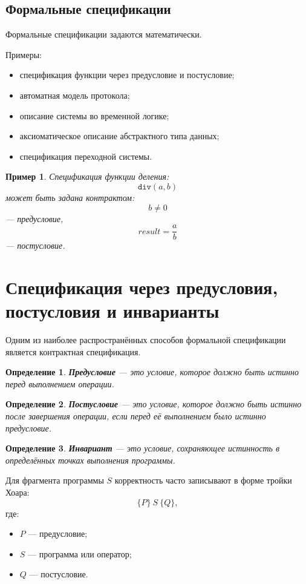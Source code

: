 \documentclass[12pt,a4paper]{article}
\newtheorem{definition}{Определение}
\newtheorem{example}{Пример}
\begin{document}
\subsection{Формальные спецификации}

Формальные спецификации задаются математически.

Примеры:
\begin{itemize}
    \item спецификация функции через предусловие и постусловие;
    \item автоматная модель протокола;
    \item описание системы во временной логике;
    \item аксиоматическое описание абстрактного типа данных;
    \item спецификация переходной системы.
\end{itemize}

\begin{example}
Спецификация функции деления:
\[
    \texttt{div}(a,b)
\]
может быть задана контрактом:
\[
    b \neq 0
\]
--- предусловие,
\[
    result = \frac{a}{b}
\]
--- постусловие.
\end{example}

\section{Спецификация через предусловия, постусловия и инварианты}

Одним из наиболее распространённых способов формальной спецификации является контрактная спецификация.

\begin{definition}
\textbf{Предусловие} --- это условие, которое должно быть истинно перед выполнением операции.
\end{definition}

\begin{definition}
\textbf{Постусловие} --- это условие, которое должно быть истинно после завершения операции, если перед её выполнением было истинно предусловие.
\end{definition}

\begin{definition}
\textbf{Инвариант} --- это условие, сохраняющее истинность в определённых точках выполнения программы.
\end{definition}

Для фрагмента программы $S$ корректность часто записывают в форме тройки Хоара:
\[
    \{P\}\ S\ \{Q\},
\]
где:
\begin{itemize}
    \item $P$ --- предусловие;
    \item $S$ --- программа или оператор;
    \item $Q$ --- постусловие.
\end{itemize}
\end{document}
